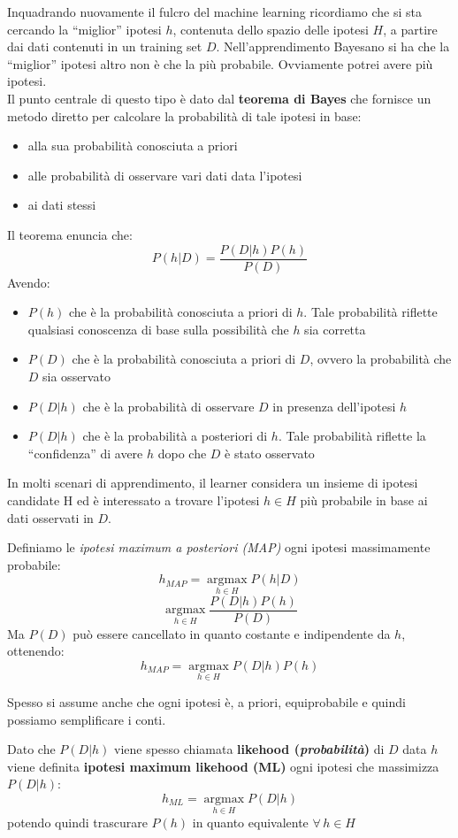 Inquadrando nuovamente il fulcro del machine learning ricordiamo che si sta
cercando la ``miglior'' ipotesi $h$, contenuta dello spazio delle ipotesi $H$, a
partire dai dati contenuti in un training set $D$. Nell'apprendimento Bayesano
si ha che la ``miglior'' ipotesi altro non è che la più probabile. Ovviamente
potrei avere più ipotesi.\\
Il punto centrale di questo tipo è dato dal \textbf{teorema di Bayes} che
fornisce un metodo diretto per calcolare la probabilità di tale ipotesi in base:
\begin{itemize}
  \item alla sua probabilità conosciuta a priori
  \item alle probabilità di osservare vari dati data l'ipotesi
  \item ai dati stessi
\end{itemize}
\begin{teorema}
  Il teorema enuncia che:
  \[P(h|D)=\frac{P(D|h)P(h)}{P(D)}\]
  Avendo:
  \begin{itemize}
    \item $P(h)$ che è la probabilità conosciuta a priori di $h$. Tale
    probabilità riflette qualsiasi conoscenza di base sulla possibilità
    che $h$ sia corretta  
    \item $P(D)$ che è la probabilità conosciuta a priori di $D$, ovvero la
    probabilità che $D$ sia osservato
    \item $P(D|h)$ che è la probabilità di osservare $D$ in presenza
    dell'ipotesi $h$
    \item $P(D|h)$ che è la probabilità a posteriori di $h$. Tale probabilità
    riflette la ``confidenza'' di avere $h$  dopo che $D$ è stato osservato
  \end{itemize}
\end{teorema}
In molti scenari di apprendimento, il learner considera un insieme di ipotesi
candidate H ed è interessato a trovare l'ipotesi $h\in H$ più probabile in base
ai dati osservati in $D$.
\begin{definizione}
  Definiamo le \textit{ipotesi maximum a posteriori (MAP)} ogni ipotesi
  massimamente probabile:
  \[h_{MAP}=\operatorname*{argmax}_{h\in H}P(h|D)\]
  \[\operatorname*{argmax}_{h\in H}\frac{P(D|h)P(h)}{P(D)}\]
  Ma $P(D)$ può essere cancellato in quanto costante e indipendente da $h$,
  ottenendo:
  \[h_{MAP}=\operatorname*{argmax}_{h\in H}P(D|h)P(h)\]
\end{definizione}
Spesso si assume anche che ogni ipotesi è, a priori, equiprobabile e quindi
possiamo semplificare i conti.
\begin{definizione}
  Dato che $P(D|h)$ viene spesso chiamata \textbf{likehood
    (\textit{probabilità})} di $D$ data $h$ viene definita \textbf{ipotesi
    maximum likehood (ML)} ogni ipotesi che massimizza $P(D|h)$:
  \[h_{ML}=\operatorname*{argmax}_{h\in H}P(D|h)\]
  potendo quindi trascurare $P(h)$ in quanto equivalente $\forall\,h\in H$
\end{definizione}

